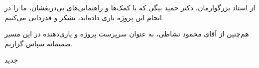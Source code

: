 

\begin{center}
\end{center}

از استاد بزرگوارمان، دکتر حمید بیگی که با کمک‌ها و راهنمایی‌های بی‌دریغشان، ما را در انجام این پروژه یاری داده‌اند، تشکر و قدردانی می‌کنیم.

هم‌چنین از آقای محمود نشاطی، به عنوان سرپرست پروژه و یاری‌دهنده در این مسیر صمیمانه سپاس گزاریم.

‌جدید
